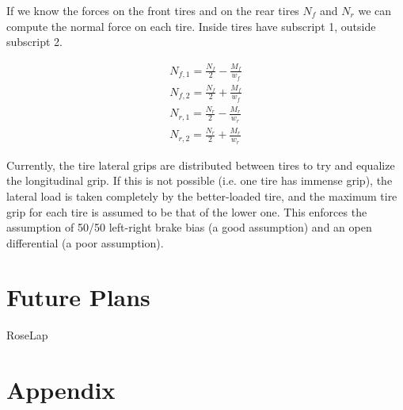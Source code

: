 \documentclass{article}
\begin{document}
If we know the forces on the front tires and on the rear tires $N_f$ and $N_r$ we can compute the normal force on each tire. Inside tires have subscript 1, outside subscript 2.

\begin{align}
	N_{f,1} = \frac{N_{f}}{2} - \frac{M_f}{w_f} \\
	N_{f,2} = \frac{N_{f}}{2} + \frac{M_f}{w_f} \\
	N_{r,1} = \frac{N_{r}}{2} - \frac{M_r}{w_r} \\
	N_{r,2} = \frac{N_{r}}{2} + \frac{M_r}{w_r}
\end{align}

Currently, the tire lateral grips are distributed between tires to try and equalize the longitudinal grip. If this is not possible (i.e. one tire has immense grip), the lateral load is taken completely by the better-loaded tire, and the maximum tire grip for each tire is assumed to be that of the lower one. This enforces the assumption of 50/50 left-right brake bias (a good assumption) and an open differential (a poor assumption).



\section{Future Plans}

RoseLap 

\section{Appendix}


\end{document}
